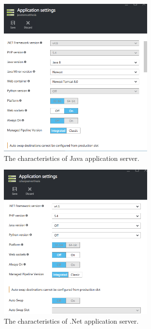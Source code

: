 \begin{figure}[!htb]
  \centering
  \includegraphics[width=0.7\textwidth]{Figures/javaserver.png}
  \caption[The characteristics of Java application server.]{The characteristics of Java application server.}
  \label{fig:javaserver}
\end{figure}

\begin{figure}[!htb]
  \centering
  \includegraphics[width=0.7\textwidth]{Figures/dotnetserver.png}
  \caption[The characteristics of .Net application server.]{The characteristics of .Net application server.}
  \label{fig:netserver}
\end{figure}
